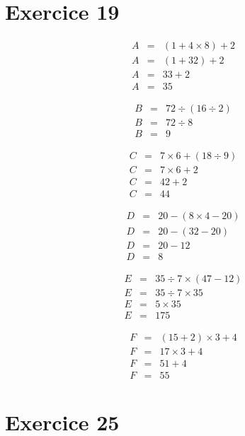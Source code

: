 \documentclass[12pt,a4paper]{extarticle}
\begin{document}
\section*{Exercice 19}
 \vspace*{-1cm}
 
\begin{multicols}{3}
	\begin{eqnarray*}
		A &=&  (1 + 4 \times 8) + 2 \\
		A &=& (1 + 32) + 2 \\
		A &=& 33 + 2 \\
		A &=& 35
	\end{eqnarray*}
	
	\begin{eqnarray*}
		B &=& 72 \div (16 \div 2) \\
		B &=& 72 \div 8 \\
		B &=& 9 
	\end{eqnarray*}
	
	\begin{eqnarray*}
		C &=& 7 \times 6 + (18 \div 9) \\
		C &=& 7 \times 6 + 2 \\
		C &=& 42 + 2 \\
		C &=& 44
	\end{eqnarray*}
	
	\begin{eqnarray*}
		D &=&  20 - (8 \times 4 - 20) \\
		D &=& 20 - (32 - 20) \\
		D &=& 20 - 12 \\
		D &=& 8
	\end{eqnarray*}
	
	\begin{eqnarray*}
		E &=& 35 \div 7 \times (47 - 12) \\
		E &=& 35 \div 7 \times 35 \\
		E &=& 5 \times 35 \\
		E &=& 175
	\end{eqnarray*}
	
	\begin{eqnarray*}
		F &=&  (15 + 2) \times 3 + 4 \\
		F &=& 17 \times 3 + 4 \\
		F &=& 51 + 4 \\
		F &=& 55
	\end{eqnarray*}
\end{multicols}

\newpage

\section*{Exercice 25}
\vspace*{-1cm}
\end{document}

